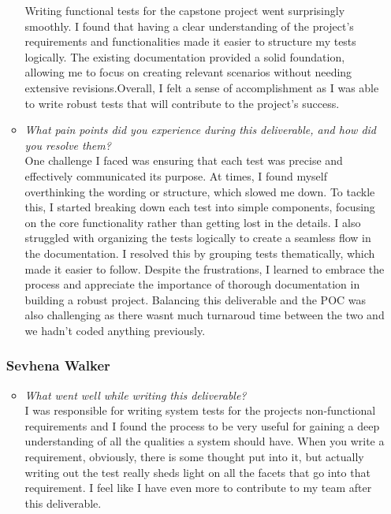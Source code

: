 \documentclass[12pt, titlepage]{article}
\begin{document}
\begin{enumerate}[label={\bf \textcolor{Maroon}{test-SRT-\arabic*}}, wide=0pt, font=\itshape]
\begin{appendices}
\begin{itemize}
  Writing functional tests for the capstone project went surprisingly 
  smoothly. I found that having a clear understanding of the project's 
  requirements and functionalities made it easier to structure my tests 
  logically. The existing documentation provided a solid foundation, 
  allowing me to focus on creating relevant scenarios without needing 
  extensive revisions.Overall, I felt a sense of accomplishment as I was able to
  write robust tests that will contribute to the project's 
  success.

  \item \textit{What pain points did you experience during this deliverable, and how did you resolve them?}\\ 
  
  One challenge I faced was ensuring that each test was precise and 
  effectively communicated its purpose. At times, I found myself 
  overthinking the wording or structure, which slowed me down. To 
  tackle this, I started breaking down each test into simple components, 
  focusing on the core functionality rather than getting lost in the 
  details. I also struggled with organizing the tests logically to 
  create a seamless flow in the documentation. I resolved this by 
  grouping tests thematically, which made it easier to follow. Despite 
  the frustrations, I learned to embrace the process and appreciate the 
  importance of thorough documentation in building a robust project. 
  Balancing this deliverable and the POC was also challenging as there 
  wasnt much turnaroud time between the two and we hadn't coded anything 
  previously.

\end{itemize}

\subsubsection*{Sevhena Walker}
\begin{itemize}
  \item \textit{What went well while writing this deliverable?} \\
  
  I was responsible for writing system tests for the projects non-functional requirements and I found the process to be very useful for gaining a deep understanding of all the qualities a system should have. When you write a requirement, obviously, there is some thought put into it, but actually writing out the test really sheds light on all the facets that go into that requirement. I feel like I have even more to contribute to my team after this deliverable.


\end{itemize}
\end{appendices}
\end{enumerate}
\end{document}
